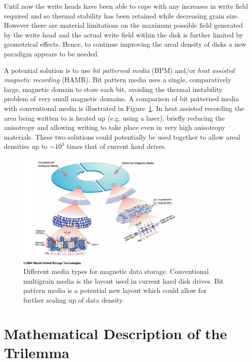 Until now the write heads have been able to cope with any increases in write field required and so thermal stability has been retained while decreasing grain size.\cite{McDaniel2005} However there are material limitations on the maximum possible field generated by the write head\cite{Richter2007a} and the actual write field within the disk is further limited by geometrical effects. Hence, to continue improving the areal density of disks a new paradigm appears to be needed.

A potential solution is to use \emph{bit patterned media} \cite{Terris2006} (BPM) and/or \emph{heat assisted magnetic recording}\cite{Kryder2008} (HAMR). Bit pattern media uses a single, comparatively large, magnetic domain to store each bit, avoiding the thermal instability problem of very small magnetic domains. A comparison of bit patterned media with conventional media is illustrated in Figure~\ref{fig:Layouts-for-magnetic}. In heat assisted recording the area being written to is heated up (e.g. using a laser), briefly reducing the anisotropy and allowing writing to take place even in very high anisotropy materials. These two solutions could potentially be used together to allow areal densities up to $\sim10^{3}$ times that of current hard drives.\cite{McDaniel2005}

\begin{figure}[!ht]
  \center
  \includegraphics[width=0.75\textwidth]{./images/conventional_vs_pattern_media}
  \caption{Different media types for magnetic data storage. Conventional multigrain media is
    the layout used in current hard disk drives. Bit pattern media is a potential new layout which could allow for further scaling up of data density.
    \cite{conventional_vs_patterned_media} \label{fig:Layouts-for-magnetic}}
\end{figure}

\section{Mathematical Description of the Trilemma}

